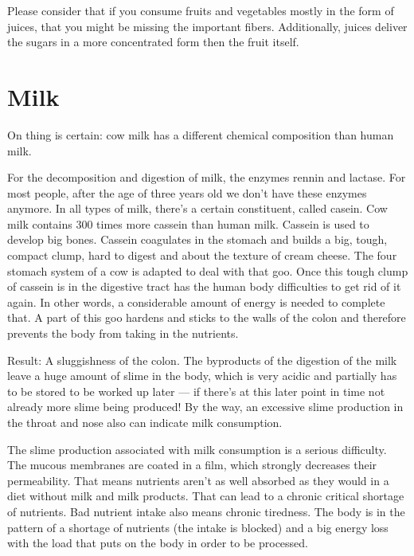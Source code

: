 \documentclass[../main.tex]{subfiles}
\begin{document}
Please consider that if you consume fruits and vegetables mostly in the form of juices, that you might be missing the important fibers.
Additionally, juices deliver the sugars in a more concentrated form then the fruit itself.

\section{Milk}

On thing is certain: cow milk has a different chemical composition than human milk.

For the decomposition and digestion of milk, the enzymes rennin and lactase.
For most people, after the age of three years old we don't have these enzymes anymore.
In all types of milk, there's a certain constituent, called casein.
Cow milk contains 300 times more cassein than human milk.
Cassein is used to develop big bones.
Cassein coagulates in the stomach and builds a big, tough, compact clump, hard to digest and about the texture of cream cheese.
The four stomach system of a cow is adapted to deal with that goo.
Once this tough clump of cassein is in the digestive tract has the human body difficulties to get rid of it again.
In other words, a considerable amount of energy is needed to complete that.
A part of this goo hardens and sticks to the walls of the colon and therefore prevents the body from taking in the nutrients.


Result: A sluggishness of the colon.
The byproducts of the digestion of the milk leave a huge amount of slime in the body, which is very acidic
and partially has to be stored to be worked up later
--- if there's at this later point in time not already more slime being produced!
By the way, an excessive slime production in the throat and nose also can indicate milk consumption.

The slime production associated with milk consumption is a serious difficulty.
The mucous membranes are coated in a film, which strongly decreases their permeability.
That means nutrients aren't as well absorbed as they would in a diet without milk and milk products.
That can lead to a chronic critical shortage  of nutrients.
Bad nutrient intake also means chronic tiredness.
The body is in the pattern of a shortage of nutrients (the intake is blocked)
and a big energy loss with the load that puts on the body in order to be processed.
\end{document}
